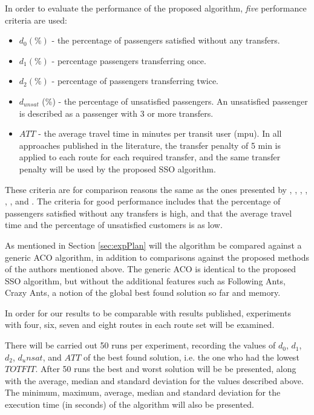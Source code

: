 In order to evaluate the performance of the proposed algorithm, \textit{five} performance criteria are used:
\begin{itemize}
\item $d_0 (\%)$ - the percentage of passengers satisfied without any transfers. 
\item $d_1 (\%)$ - percentage passengers transferring once. 
\item $d_2 (\%)$ - percentage of passengers transferring twice. 
\item $d_{unsat}$ (\%) - the percentage of unsatisfied passengers. An unsatisfied passenger is described as a passenger with 3 or more transfers. 
\item $ATT$  - the average travel time in minutes per transit user (mpu). In all approaches published in the literature, the transfer penalty of 5 min is applied to each route for each required transfer, and the same transfer penalty will be used by the proposed SSO algorithm.
\end{itemize}
These criteria are for comparison reasons the same as the ones presented by \citet{mandl79}, \citet{kechagiopoulos14}, \citet{kidwai98}, \citet{fan10}, \citet{chakroborty02}, \citet{zhang10}, and \citet{chew12}. The criteria for good performance includes that the percentage of passengers satisfied without any transfers is high, and that the average travel time and the percentage of unsatisfied customers is as low. 

As mentioned in Section \vref{sec:expPlan} will the algorithm be compared against a generic ACO algorithm, in addition to comparisons against the proposed methods of the authors mentioned above. The generic ACO is identical to the proposed SSO algorithm, but without the additional features such as Following Ants, Crazy Ants, a notion of the global best found solution so far and memory. 

In order for our results to be comparable with results published, experiments with four, six, seven and eight routes in each route set will be examined. 

There will be carried out 50 runs per experiment, recording the values of $d_0$, $d_1$, $d_2$, $d_unsat$, and $ATT$ of the best found solution, i.e. the one who had the lowest $TOTFIT$. After 50 runs the best and worst solution will be be presented, along with the average, median and standard deviation for the values described above. The minimum, maximum, average, median and standard deviation for the execution time (in seconds) of the algorithm will also be presented.  


